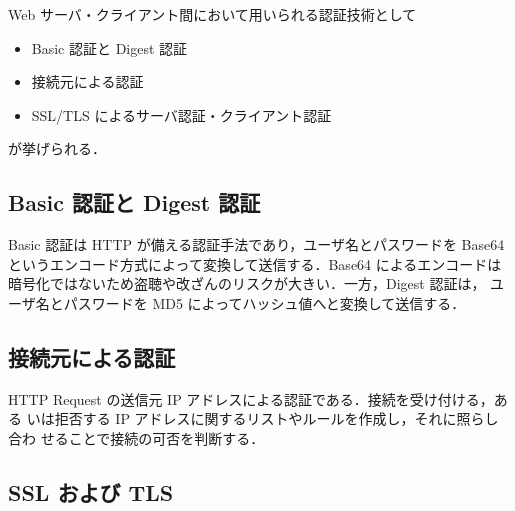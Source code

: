Web サーバ・クライアント間において用いられる認証技術として
\begin{itemize}
\item Basic 認証と Digest 認証
\item 接続元による認証
\item SSL/TLS によるサーバ認証・クライアント認証
\end{itemize}
が挙げられる．

\subsection{Basic 認証と Digest 認証}
Basic 認証は HTTP が備える認証手法であり，ユーザ名とパスワードを Base64 
というエンコード方式によって変換して送信する．Base64 によるエンコードは
暗号化ではないため盗聴や改ざんのリスクが大きい．一方，Digest 認証は，
ユーザ名とパスワードを MD5 によってハッシュ値へと変換して送信する．

\subsection{接続元による認証}
HTTP Request の送信元 IP アドレスによる認証である．接続を受け付ける，ある
いは拒否する IP アドレスに関するリストやルールを作成し，それに照らし合わ
せることで接続の可否を判断する．

\subsection{SSL および TLS}


